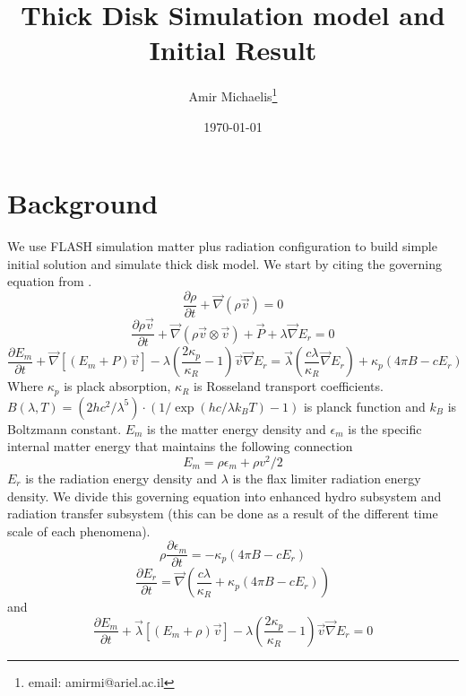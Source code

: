 \documentclass[12pt, a4paper]{article}
\title{Thick Disk Simulation model and Initial Result}
\author{Amir Michaelis\footnote{email: amirmi@ariel.ac.il}}
\date{\today}
\begin{document}
\maketitle
\section{Background}
We use FLASH simulation \cite{2000ApJS..131..273F} matter plus radiation configuration to build simple initial solution and simulate thick disk model.
We start by citing the governing equation from \cite{2019ApJ...876..148C}.
\begin{equation}
    \frac{\partial \rho}{\partial t} + \vec \nabla(\rho\vec v)=0
\end{equation}
\begin{equation}
    \frac{\partial \rho \vec v}{\partial t}+\vec\nabla(\rho\vec v\otimes\vec v)+\vec P+\lambda\vec\nabla E_r=0
\end{equation}
\begin{equation}
    \frac{\partial E_m}{\partial t}+\vec\nabla[(E_m+P)\vec v]-\lambda(\frac{2\kappa_p}{\kappa_R}-1)\vec v \vec\nabla E_r = 
        \vec\lambda(\frac{c\lambda}{\kappa_R}\vec\nabla E_r)+\kappa_p(4\pi B-cE_r)
\end{equation}
Where $\kappa_p$ is plack absorption, $\kappa_R$ is Rosseland transport coefficients.
$B(\lambda,T)=(2hc^2/\lambda^5)\cdot(1/\exp(hc/\lambda k_B T)-1 )$ is planck function and $k_B$ is Boltzmann constant.
$E_m$ is the matter energy density and $\epsilon_m$ is the specific internal matter energy that maintains the following connection
\begin{equation}
    E_m=\rho\epsilon_m+\rho v^2/2
\end{equation}
$E_r$ is the radiation energy density and $\lambda$ is the flax limiter radiation energy density.
We divide this governing equation into enhanced hydro subsystem and radiation transfer subsystem (this can be done as a result of the different time scale of each phenomena).
\begin{equation}
    \rho\frac{\partial \epsilon_m}{\partial t} = -\kappa_p(4\pi B-c E_r)
\end{equation}
\begin{equation}
    \frac{\partial E_r}{\partial t} = \vec\nabla(\frac{c\lambda}{\kappa_R}+\kappa_p(4\pi B-c E_r))
\end{equation}
and
\begin{equation}
    \frac{\partial E_m}{\partial t}+\vec\lambda[(E_m+\rho)\vec v]-\lambda(\frac{2\kappa_p}{\kappa_R}-1)\vec v \vec \nabla E_r =0
\end{equation}
\end{document}
